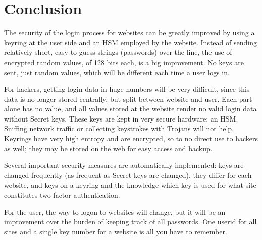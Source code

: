 \section{Conclusion}
The security of the login process for websites can be greatly improved by using a keyring at the user side and an HSM employed by the website.
Instead of sending relatively short, easy to guess strings (passwords) over the line,
the use of encrypted random values,
of 128 bits each,
is a big improvement.
No keys are sent,
just random values,
which will be different each time a user logs in.
\par
For hackers,
getting login data in huge numbers will be very difficult,
since this data is no longer stored centrally,
but split between website and user.
Each part alone has no value,
and all values stored at the website render no valid login data without Secret keys.
These keys are kept in very secure hardware: an HSM.
Sniffing network traffic
or collecting keystrokes with Trojans will not help.
Keyrings have very high entropy and are encrypted,
so to no direct use to hackers as well;
they may be stored on the web for easy access and backup.
\par
Several important security measures are automatically implemented:
keys are changed frequently
(as frequent as Secret keys are changed),
they differ for each website,
and keys on a keyring and the knowledge which key is used for what site constitutes two-factor authentication.
\par
For the user,
the way to logon to websites will change,
but it will be an improvement over the burden of keeping track of all passwords.
One userid for all sites and a single key number for a website is all you have to remember.

